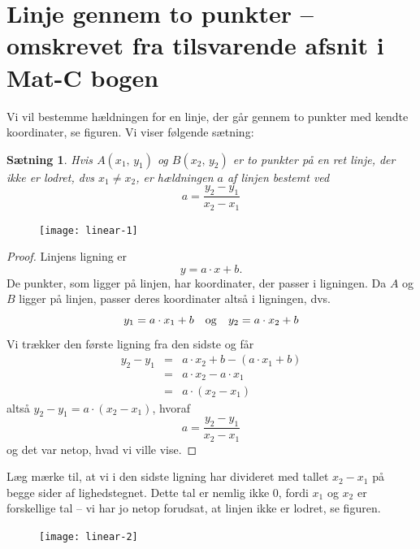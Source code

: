 \documentclass[12pt,oneside,a4paper]{article}
\newcommand{\bas}{\begin{eqnarray*}}
\newcommand{\eas}{\end{eqnarray*}}
\newtheorem{thm}{Sætning}[section]
\begin{document}
\section{Linje gennem to punkter -- omskrevet fra tilsvarende afsnit i Mat-C bogen}
Vi vil bestemme hældningen for en linje, der går gennem
to punkter med kendte koordinater, se figuren. Vi viser følgende sætning:
\begin{thm}
    Hvis $A(x_1,\,y_1)$ og $B(x_2,\,y_2)$ er to punkter på en ret linje, der ikke
    er lodret, dvs $x_1\neq x_2$, er hældningen $a$ af linjen bestemt ved
    $$
    a = \frac{y_2-y_1}{x_2-x_1}
    $$
\end{thm}

\begin{figure}[ht]
    \centering
    \texttt{[image: linear-1]}
    \label{linear-1}
\end{figure}

\begin{proof}
    Linjens ligning er
    $$
    y = a\cdot x + b.
    $$
    De punkter, som ligger på linjen, har koordinater, der passer i
    ligningen.  Da $A$ og $B$ ligger på linjen, passer deres koordinater altså
    i ligningen, dvs.
    $$
    y_1 = a\cdot x_1 + b \quad {\rm og} \quad y_2 = a\cdot x_2 + b 
    $$
    Vi trækker den første ligning fra den sidste og får
    \bas
    y_2 - y_1 &=& a\cdot x_2 + b - (a\cdot x_1 + b) \\
              &=& a\cdot x_2 - a\cdot x_1 \\
              &=& a\cdot \left(x_2-x_1\right) 
    \eas
    altså $y_2-y_1 = a \cdot \left(x_2-x_1\right)$, hvoraf
    $$
    a = \frac{y_2-y_1}{x_2-x_1}
    $$
    og det var netop, hvad vi ville vise.
\end{proof}

Læg mærke til, at vi i den sidste ligning har divideret med tallet $x_2-x_1$ på
begge sider af lighedstegnet. Dette tal er nemlig ikke $0$, fordi $x_1$ og
$x_2$ er forskellige tal -- vi har jo netop forudsat, at linjen ikke er lodret, se
figuren.

\begin{figure}[ht]
    \centering
    \texttt{[image: linear-2]}
    \label{linear-2}
\end{figure}
\end{document}
